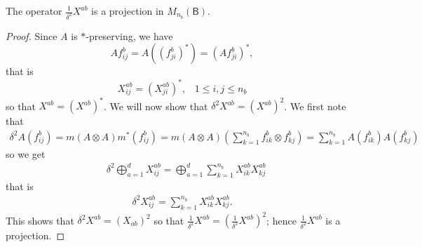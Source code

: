 \documentclass[10pt,a4paper]{amsart}
\newcommand{\B}{\mathsf{B}}
\begin{document}
\begin{lemma}
    The operator $\frac{1}{\delta^2}X^{ab}$ is a projection in $M_{n_b}(\B)$.
\end{lemma}

\begin{proof}
Since $A$ is $\ast$-preserving, we have
\[Af_{ij}^{b}=A((f_{ji}^{b})^*)=(Af_{ji}^{b})^*,\]
that is
\[X_{ij}^{ab}=(X_{ji}^{ab})^*,\;\;\;1\leq i,j\leq n_b\]
so that $X^{ab}=(X^{ab})^*$. We will now show that $\delta^2 X^{ab}=(X^{ab})^2$. We first note that
\begin{align*}
    \delta^2 A(f_{{ij}}^{b})=m(A\otimes A)m^*(f_{ij}^{b})=m(A\otimes A)\left(\sum_{k=1}^{n_b}f_{ik}^b\otimes f_{kj}^b\right)=\sum_{k=1}^{n_b}A(f_{ik}^b)A(f_{kj}^b)
\end{align*}
so we get
\begin{align*}
    &\delta^2\bigoplus_{a=1}^dX_{ij}^{ab}=\bigoplus_{a=1}^d\sum_{k=1}^{n_b}X_{ik}^{ab}X_{kj}^{ab}    
    \end{align*}
    that is
     \begin{align*}
    \delta^2 X_{ij}^{ab}=\sum_{k=1}^{n_b}X_{ik}^{ab}X_{kj}^{ab}.
    \end{align*}
   This shows that  $\delta^2 X^{ab}= (X_{ab})^2$
    so that $\frac{1}{\delta^2}X^{ab}=(\frac{1}{\delta^2}X^{ab})^2$; hence $\frac{1}{\delta^2}X^{ab}$ is a projection.
    \end{proof}
\end{document}
